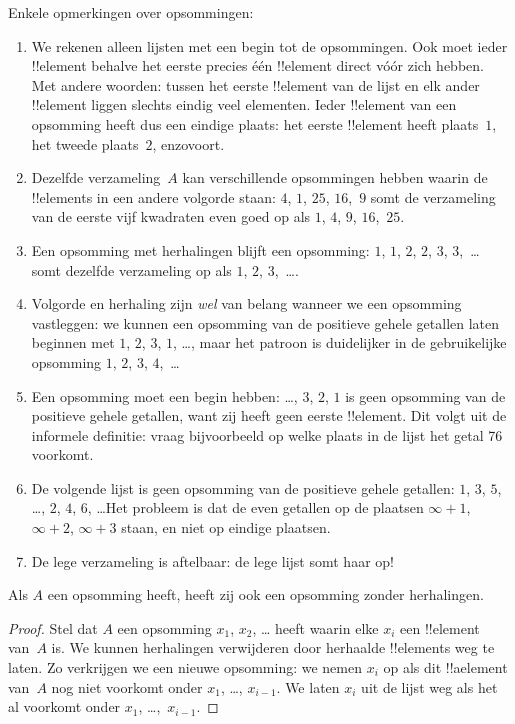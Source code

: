 \documentclass[openany]{memoir}
\begin{document}
\begin{explain}
Enkele opmerkingen over opsommingen:
\begin{enumerate}
\item We rekenen alleen lijsten met een begin tot de opsommingen. Ook
  moet ieder !!{element} behalve het eerste precies één !!{element}
  direct vóór zich hebben. Met andere woorden: tussen het eerste
  !!{element} van de lijst en elk ander !!{element} liggen slechts
  eindig veel elementen. Ieder !!{element} van een opsomming heeft dus
  een eindige plaats: het eerste !!{element} heeft plaats~$1$, het
  tweede plaats~$2$, enzovoort.
\item Dezelfde verzameling~$A$ kan verschillende opsommingen hebben
  waarin de !!{element}s in een andere volgorde staan: $4$, $1$,
  $25$, $16$,~$9$ somt de verzameling van de eerste vijf kwadraten
  even goed op als $1$, $4$, $9$, $16$,~$25$.
\item Een opsomming met herhalingen blijft een opsomming: $1$, $1$, $2$,
  $2$, $3$, $3$,~\dots{} somt dezelfde verzameling op als $1$, $2$,
  $3$,~\dots{}.
\item Volgorde en herhaling zijn \emph{wel} van belang wanneer we een
  opsomming vastleggen: we kunnen een opsomming van de positieve gehele
  getallen laten beginnen met $1$, $2$, $3$, $1$, \dots{}, maar het patroon is duidelijker in
  de gebruikelijke opsomming $1$, $2$, $3$, $4$,~\dots
\item Een opsomming moet een begin hebben: \dots, $3$, $2$, $1$ is geen
  opsomming van de positieve gehele getallen, want zij heeft geen eerste
  !!{element}. Dit volgt uit de informele definitie: vraag bijvoorbeeld
  op welke plaats in de lijst het getal 76 voorkomt.
\item De volgende lijst is geen opsomming van de positieve gehele getallen:
  $1$, $3$, $5$, \dots, $2$, $4$, $6$, \dots\@ Het probleem is dat de
  even getallen op de plaatsen $\infty + 1$, $\infty + 2$, $\infty +
  3$ staan, en niet op eindige plaatsen.
\item De lege verzameling is aftelbaar: de lege lijst somt haar op!{}
\end{enumerate}
\end{explain}

\begin{prop}
  Als $A$ een opsomming heeft, heeft zij ook een opsomming zonder
  herhalingen.
\end{prop}

\begin{proof}
  Stel dat $A$ een opsomming $x_1$, $x_2$, \dots{} heeft waarin elke
  $x_i$ een !!{element} van~$A$ is. We kunnen herhalingen verwijderen
  door herhaalde !!{element}s weg te laten. Zo verkrijgen we een nieuwe
  opsomming: we nemen $x_i$ op als dit !!a{element} van~$A$ nog niet
  voorkomt onder $x_1$, \dots, $x_{i-1}$. We laten $x_i$ uit de lijst
  weg als het al voorkomt onder $x_1$, \dots,~$x_{i-1}$.
\end{proof}
\end{document}
